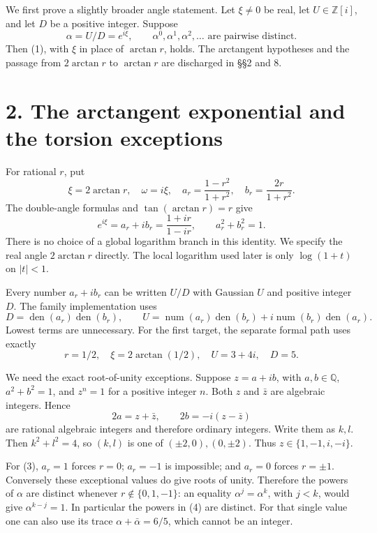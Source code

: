 \documentclass[11pt]{article}
\begin{document}
We first prove a slightly broader angle statement. Let \(\xi\ne0\) be
real, let \(U\in\mathbb Z[i]\), and let \(D\) be a positive integer.
Suppose \[
\alpha=U/D=e^{i\xi},\qquad
\alpha^0,\alpha^1,\alpha^2,\ldots\text{ are pairwise distinct}.
\tag{2}
\] Then (1), with \(\xi\) in place of \(\arctan r\), holds. The
arctangent hypotheses and the passage from \(2\arctan r\) to
\(\arctan r\) are discharged in §§2 and 8.

\section{2. The arctangent exponential and the torsion
exceptions}\label{the-arctangent-exponential-and-the-torsion-exceptions}

For rational \(r\), put \[
\xi=2\arctan r,\quad \omega=i\xi,\quad
a_r=\frac{1-r^2}{1+r^2},\quad b_r=\frac{2r}{1+r^2}.
\] The double-angle formulas and \(\tan(\arctan r)=r\) give \[
e^{i\xi}=a_r+ib_r=\frac{1+ir}{1-ir},\qquad a_r^2+b_r^2=1.
\tag{3}
\] There is no choice of a global logarithm branch in this identity. We
specify the real angle \(2\arctan r\) directly. The local logarithm used
later is only \(\log(1+t)\) on \(|t|<1\).

Every number \(a_r+ib_r\) can be written \(U/D\) with Gaussian \(U\) and
positive integer \(D\). The family implementation uses \[
D=\operatorname{den}(a_r)\operatorname{den}(b_r),\qquad
U=\operatorname{num}(a_r)\operatorname{den}(b_r)
+i\operatorname{num}(b_r)\operatorname{den}(a_r).
\] Lowest terms are unnecessary. For the first target, the separate
formal path uses exactly \[
r=1/2,\quad \xi=2\arctan(1/2),\quad U=3+4i,\quad D=5.
\tag{4}
\]

We need the exact root-of-unity exceptions. Suppose \(z=a+ib\), with
\(a,b\in\mathbb Q\), \(a^2+b^2=1\), and \(z^n=1\) for a positive integer
\(n\). Both \(z\) and \(\bar z\) are algebraic integers. Hence \[
2a=z+\bar z,\qquad 2b=-i(z-\bar z)
\] are rational algebraic integers and therefore ordinary integers.
Write them as \(k,l\). Then \(k^2+l^2=4\), so \((k,l)\) is one of
\((\pm2,0),(0,\pm2)\). Thus \(z\in\{1,-1,i,-i\}\).

For (3), \(a_r=1\) forces \(r=0\); \(a_r=-1\) is impossible; and
\(a_r=0\) forces \(r=\pm1\). Conversely these exceptional values do give
roots of unity. Therefore the powers of \(\alpha\) are distinct whenever
\(r\notin\{0,1,-1\}\): an equality \(\alpha^j=\alpha^k\), with \(j<k\),
would give \(\alpha^{k-j}=1\). In particular the powers in (4) are
distinct. For that single value one can also use its trace
\(\alpha+\bar\alpha=6/5\), which cannot be an integer.
\end{document}
